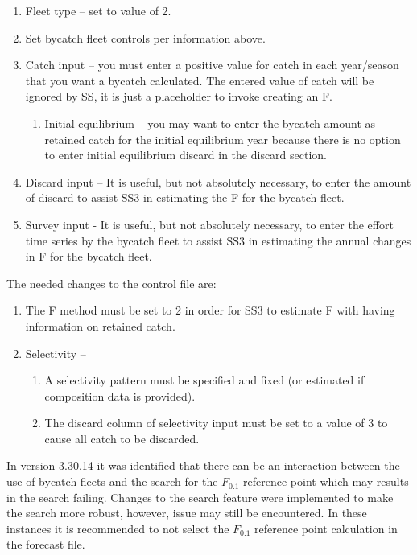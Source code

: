 \begin{enumerate}
	\item Fleet type – set to value of 2.
	\item Set bycatch fleet controls per information above.
	\item Catch input – you must enter a positive value for catch in each year/season that you want a bycatch calculated.  The entered value of catch will be ignored by SS, it is just a placeholder to invoke creating an F.
	\begin{enumerate}
		\item Initial equilibrium – you may want to enter the bycatch amount as retained catch for the initial equilibrium year because there is no option to enter initial equilibrium discard in the discard section.
	\end{enumerate}	
	\item Discard input – It is useful, but not absolutely necessary, to enter the amount of discard to assist SS3 in estimating the F for the bycatch fleet.
	\item Survey input - It is useful, but not absolutely necessary, to enter the effort time series by the bycatch fleet to assist SS3 in estimating the annual changes in F for the bycatch fleet.
\end{enumerate}

The needed changes to the control file are:

\begin{enumerate}
	\item The F method must be set to 2 in order for SS3 to estimate F with having information on retained catch.
	\item Selectivity – 
	\begin{enumerate}
		\item A selectivity pattern must be specified and fixed (or estimated if composition data is provided).
		\item The discard column of selectivity input must be set to a value of 3 to cause all catch to be discarded.
	\end{enumerate}	
\end{enumerate}

In version 3.30.14 it was identified that there can be an interaction between the use of bycatch fleets and the search for the $F_{0.1}$ reference point which may results in the search failing.  Changes to the search feature were implemented to make the search more robust, however, issue may still be encountered. In these instances it is recommended to not select the $F_{0.1}$ reference point calculation in the forecast file.

